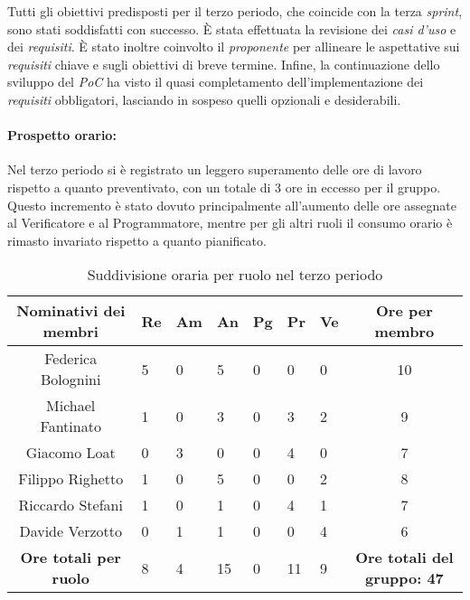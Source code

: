 Tutti gli obiettivi predisposti per il terzo periodo, che coincide con la terza \emph{sprint}, sono stati soddisfatti con successo.
È stata effettuata la revisione dei \emph{casi d’uso} e dei \emph{requisiti}. È stato inoltre coinvolto il \emph{proponente} per allineare le aspettative sui \emph{requisiti} chiave e sugli obiettivi di breve termine.
Infine, la continuazione dello sviluppo del \emph{PoC} ha visto il quasi completamento dell'implementazione dei \emph{requisiti} obbligatori, lasciando in sospeso quelli opzionali e desiderabili.

\newpage
\paragraph{Prospetto orario: }
Nel terzo periodo si è registrato un leggero superamento delle ore di lavoro rispetto a quanto preventivato, con un totale di 3 ore in eccesso per il gruppo.\\
Questo incremento è stato dovuto principalmente all’aumento delle ore assegnate al Verificatore e al Programmatore, mentre per gli altri ruoli il consumo orario è rimasto invariato rispetto a quanto pianificato.
\begin{table}[h!]
    \centering
    \renewcommand{\arraystretch}{1.5}
    \begin{tabularx}{\textwidth}{|c|X|X|X|X|X|X|c|}\hline
    \rowcolor[HTML]{FFD700} 
    \textbf{Nominativi dei membri} & \textbf{Re} & \textbf{Am} & \textbf{An} & \textbf{Pg} & \textbf{Pr} & \textbf{Ve} & \textbf{Ore per membro} \\ \hline
    Federica Bolognini & 5 & 0 & 5 & 0 & 0 & 0 & 10  \\ \hline
    Michael Fantinato  & 1 & 0 & 3 & 0 & 3 & 2 & 9  \\ \hline
    Giacomo Loat       & 0 & 3 & 0 & 0 & 4 & 0 & 7 \\ \hline
    Filippo Righetto   & 1 & 0 & 5 & 0 & 0 & 2 & 8  \\ \hline
    Riccardo Stefani   & 1 & 0 & 1 & 0 & 4 & 1 & 7 \\ \hline
    Davide Verzotto    & 0 & 1 & 1 & 0 & 0 & 4 & 6  \\ \hline
    \rowcolor[HTML]{FFD700} 
    \textbf{Ore totali per ruolo} & 8 & 4 & 15 & 0 & 11 & 9 & \textbf{Ore totali del gruppo: 47} \\ \hline
    \end{tabularx}
    \caption{Suddivisione oraria per ruolo nel terzo periodo}
\end{table}

